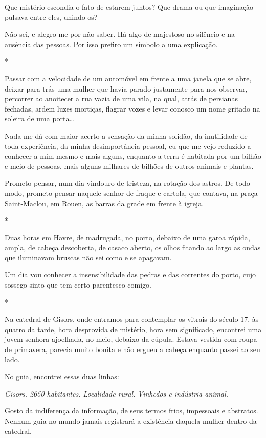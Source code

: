 Que mistério escondia o fato de estarem juntos? Que drama ou que
imaginação pulsava entre eles, unindo-os?

Não sei, e alegro-me por não saber. Há algo de majestoso no silêncio e
na ausência das pessoas. Por isso prefiro um símbolo a uma explicação.

*

Passar com a velocidade de um automóvel em frente a uma janela que se
abre, deixar para trás uma mulher que havia parado justamente para nos
observar, percorrer ao anoitecer a rua vazia de uma vila, na qual, atrás
de persianas fechadas, ardem luzes mortiças, flagrar vozes e levar
conosco um nome gritado na soleira de uma porta\ldots{}

Nada me dá com maior acerto a sensação da minha solidão, da inutilidade
de toda experiência, da minha desimportância pessoal, eu que me vejo
reduzido a conhecer a mim mesmo e mais alguns, enquanto a terra é
habitada por um bilhão e meio de pessoas, mais alguns milhares de
bilhões de outros animais e plantas.

Prometo pensar, num dia vindouro de tristeza, na rotação dos astros. De
todo modo, prometo pensar naquele senhor de fraque e cartola, que
contava, na praça Saint-Maclou, em Rouen, as barras da grade em frente à
igreja.

*

Duas horas em Havre, de madrugada, no porto, debaixo de uma garoa
rápida, ampla, de cabeça descoberta, de casaco aberto, os olhos fitando
ao largo as ondas que iluminavam bruscas não sei como e se apagavam.

Um dia vou conhecer a insensibilidade das pedras e das correntes do
porto, cujo sossego sinto que tem certo parentesco comigo.

*

Na catedral de Gisors, onde entramos para contemplar os vitrais do
século 17, às quatro da tarde, hora desprovida de mistério, hora sem
significado, encontrei uma jovem senhora ajoelhada, no meio, debaixo da
cúpula. Estava vestida com roupa de primavera, parecia muito bonita e
não ergueu a cabeça enquanto passei ao seu lado.

No guia, encontrei essas duas linhas:

\emph{Gisors. 2650 habitantes. Localidade rural. Vinhedos e indústria
animal.}

Gosto da indiferença da informação, de seus termos frios, impessoais e
abstratos. Nenhum guia no mundo jamais registrará a existência daquela
mulher dentro da catedral.

